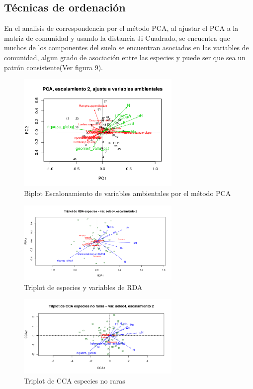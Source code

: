 \documentclass[11pt,]{article}
\begin{document}
\subsection{Técnicas de ordenación}\label{tuxe9cnicas-de-ordenaciuxf3n}

En el analisis de correspondencia por el método PCA, al ajustar el PCA a
la matriz de comunidad y usando la distancia Ji Cuadrado, se encuentra
que muchos de los componentes del suelo se encuentran asociados en las
variables de comunidad, algun grado de asociación entre las especies y
puede ser que sea un patrón consistente(Ver figura 9).

\begin{figure}
\centering
\includegraphics[width=0.70000\textwidth]{Escalonamiento_ajustado_variables_ambientales_PCA.png}
\caption{Biplot Escalonamiento de variables ambientales por el método
PCA}
\end{figure}

\begin{figure}
\centering
\includegraphics[width=0.70000\textwidth]{triplot_RDA_especies.png}
\caption{Triplot de especies y variables de RDA}
\end{figure}

\begin{figure}
\centering
\includegraphics[width=0.70000\textwidth]{Triplot_CCA_varible.png}
\caption{Triplot de CCA especies no raras}
\end{figure}
\end{document}

